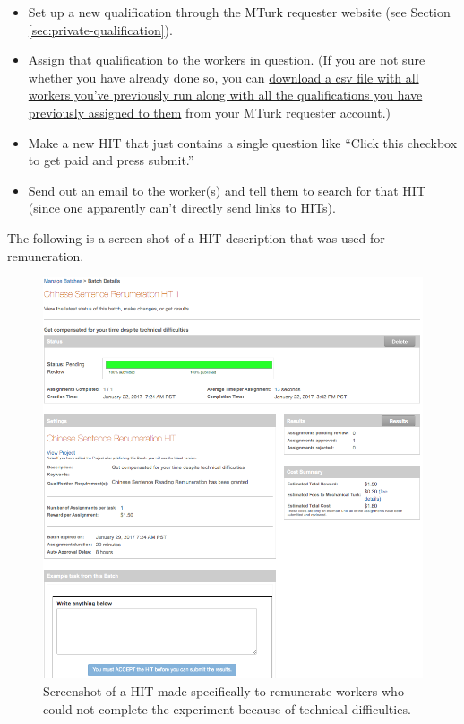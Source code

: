 \documentclass{article}
\begin{document}
\begin{itemize}
	\item Set up a new qualification through the MTurk requester website (see Section \ref{sec:private-qualification}).
	\item Assign that qualification to the workers in question. (If you are not sure whether you have already done so, you can  \href{https://requester.mturk.com/workers/download?utf8=\%E2\%9C\%93&check=true}{download a csv file with all workers you've previously run along with all the qualifications you have previously assigned to them} from your MTurk requester account.)
	\item Make a new HIT that just contains a single question like ``Click this checkbox to get paid and press submit.''
	\item Send out an email to the worker(s) and tell them to search for that HIT (since one apparently can't directly send links to HITs). 
\end{itemize}

The following is a screen shot of a HIT description that was used for remuneration.

\begin{figure}[htbp]
\begin{center}
\includegraphics[width=.9\textwidth]{figures/remuneration}
\caption{Screenshot of a HIT made specifically to remunerate workers who could not complete the experiment because of technical difficulties.}
\label{default}
\end{center}
\end{figure}
\end{document}
